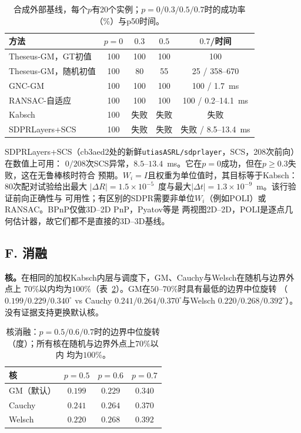 \begin{table}[t]
\caption{合成外部基线，每个$p$有20个实例；$p=0/0.3/0.5/0.7$时的成功率（\%）与p50时间。}
\label{tab:baselines}
\centering
\scriptsize
\setlength{\tabcolsep}{1.8pt}
\begin{tabular}{lcccc}
\toprule
方法 & $p=0$ & $0.3$ & $0.5$ & $0.7$/时间 \\
\midrule
Theseus-GM，GT初值 & 100 & 100 & 100 & 100 \\
Theseus-GM，随机初值 & 100 & 80 & 55 & 25 / 358--670 \\
GNC-GM & 100 & 100 & 100 & 100 / 1.7~ms \\
RANSAC-自适应 & 100 & 100 & 100 & 100 / 0.2--14.1~ms \\
Kabsch & 100 & 失败 & 失败 & 失败 \\
SDPRLayers+SCS & 100 & 失败 & 失败 & 失败 / 8.5--13.4~ms \\
\bottomrule
\end{tabular}
\end{table}

SDPRLayers+SCS（cb3aed2处的新鲜\texttt{utiasASRL/sdprlayer}，SCS，208次前向）在数值上可用：
$0/208$次SCS异常，$8.5$--$13.4$~ms。它在$p=0$成功，但在$p\ge0.3$失败，这在无鲁棒核时符合
预期。$W_i=I$且权重为单位值时，其目标等于Kabsch：80次配对试验给出最大
$|\Delta R|=1.5\times10^{-5}$~度与最大$|\Delta t|=1.3\times10^{-9}$~m。该行验证前向正确性与
可用性；有区别的SDPR需要非单位$W_i$（例如POLI）或RANSAC。BPnP仅做3D--2D PnP，Pyatov等是
两视图2D--2D，POLI是逐点几何估计器，故它们都不是直接的3D--3D基线。

\subsection*{F. 消融}
\label{app:ablations}

\noindent\textbf{核。}在相同的加权Kabsch内层与调度下，GM、Cauchy与Welsch在随机与边界外点上
$70\%$以内均为$100\%$（表~\ref{tab:kernelabl}）。GM在$50$--$70\%$时具有最低的边界中位旋转
（$0.199/0.229/0.340^\circ$ vs Cauchy $0.241/0.264/0.370^\circ$与Welsch
$0.220/0.268/0.392^\circ$）。没有证据支持更换默认核。

\begin{table}[t]
\caption{核消融：$p=0.5/0.6/0.7$时的边界中位旋转（度）；所有核在随机与边界外点上$70\%$以内
均为$100\%$。}
\label{tab:kernelabl}
\centering
\footnotesize
\setlength{\tabcolsep}{4pt}
\begin{tabular}{lccc}
\toprule
核 & $p=0.5$ & $p=0.6$ & $p=0.7$ \\
\midrule
GM（默认） & $0.199$ & $0.229$ & $0.340$ \\
Cauchy & $0.241$ & $0.264$ & $0.370$ \\
Welsch & $0.220$ & $0.268$ & $0.392$ \\
\bottomrule
\end{tabular}
\end{table}

